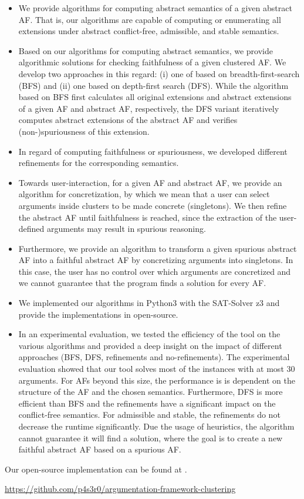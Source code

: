 \begin{itemize}
    \item We provide algorithms for computing abstract semantics of a given abstract AF. That is, our algorithms are capable of computing or enumerating all extensions under abstract conflict-free, admissible, and stable semantics.

    \item Based on our algorithms for computing abstract semantics, we provide algorithmic solutions for checking faithfulness of a given clustered AF. We develop two approaches in this regard: (i) one of based on breadth-first-search (BFS) and (ii) one based on depth-first search (DFS). While the algorithm based on BFS first calculates all original extensions and abstract extensions of a given AF and abstract AF, respectively, the DFS variant iteratively computes abstract extensions of the abstract AF and verifies (non-)spuriousness of this extension.

    \item In regard of computing faithfulness or spuriousness, we developed different refinements for the corresponding semantics.

    \item Towards user-interaction, for a given AF and abstract AF, we provide an algorithm for concretization, by which we mean that a user can select arguments inside clusters to be made concrete (singletons). We then refine the abstract AF until faithfulness is reached, since the extraction of the user-defined arguments may result in spurious reasoning. 

    \item Furthermore, we provide an algorithm to transform a given spurious abstract AF into a faithful abstract AF by concretizing arguments into singletons. In this case, the user has no control over which arguments are concretized and we cannot guarantee that the program finds a solution for every AF.

    \item We implemented our algorithms in Python3 with the SAT-Solver z3 and provide the implementations in open-source.

    \item In an experimental evaluation, we tested the efficiency of the tool on the various algorithms and provided a deep insight on the impact of different approaches (BFS, DFS, refinements and no-refinements). The experimental evaluation showed that our tool solves most of the instances with at most 30 arguments. For AFs beyond this size, the performance is is dependent on the structure of the AF and the chosen semantics. Furthermore, DFS is more efficient than BFS and the refinements have a significant impact on the conflict-free semantics. For admissible and stable, the refinements do not decrease the runtime significantly. Due the usage of heuristics, the algorithm cannot guarantee it will find a solution, where the goal is to create a new faithful abstract AF based on a spurious AF.
\end{itemize}

Our open-source implementation can be found at \cite{Pasero2024-AFClustering-Repo}.

\begin{center}
    \url{https://github.com/p4s3r0/argumentation-framework-clustering}
\end{center}

